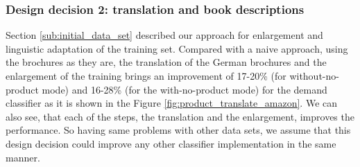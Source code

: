 \subsubsection{Design decision 2: translation and book descriptions}
Section \ref{sub:initial_data_set} described our approach for enlargement and linguistic adaptation of the training set.
Compared with a naive approach, using the brochures as they are, the translation of the German brochures and the enlargement of the training brings an improvement of 17-20\% (for without-no-product mode) and 16-28\% (for the with-no-product mode) for the demand classifier as it is shown in the Figure \ref{fig:product_translate_amazon}.
We can also see, that each of the steps, the translation and the enlargement, improves the performance.
So having same problems with other data sets, we assume that this design decision could improve any other classifier implementation in the same manner.

